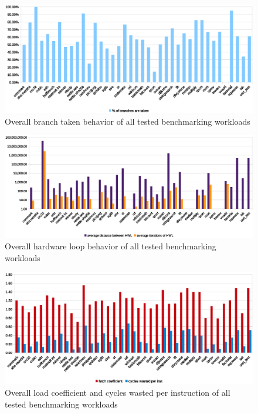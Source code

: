 \documentclass[../bachelor_paper.tex]{subfiles}
\begin{document}
\begin{figure}
    \centering
    \includegraphics[width=\textwidth]{img/graph/overall_branch_tk.eps}
    \caption{Overall branch taken behavior of all tested benchmarking workloads}
    \label{fig:res/overall/branch_tk}
\end{figure}

\begin{figure}
    \centering
    \includegraphics[width=\textwidth]{img/graph/overall_hwl.eps}
    \caption{Overall hardware loop behavior of all tested benchmarking workloads}
    \label{fig:res/overall/hwl}
\end{figure}

\begin{figure}
    \centering
    \includegraphics[width=\textwidth]{img/graph/overall_fetch_waste.eps}
    \caption{Overall load coefficient and cycles wasted per instruction of all tested benchmarking workloads}
    \label{fig:res/overall/fetch_waste}
\end{figure}
\end{document}
